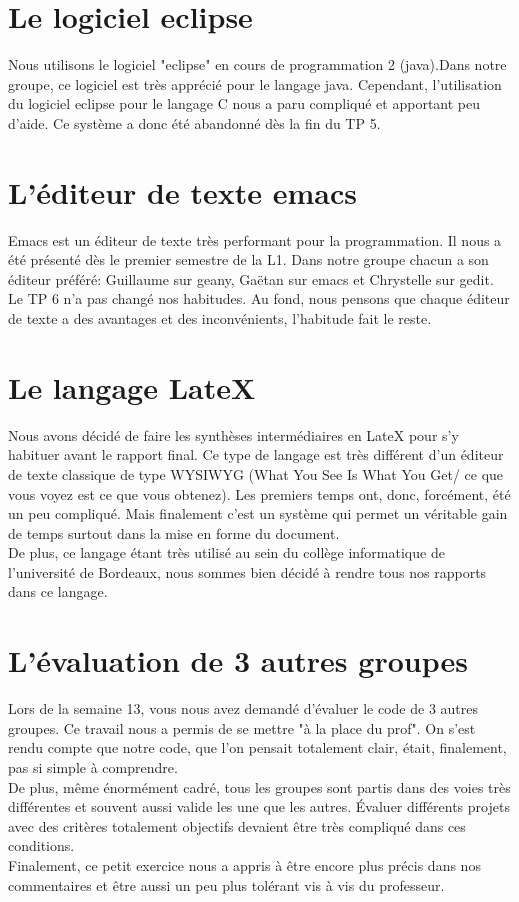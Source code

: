 \documentclass{report}
\begin{document}
\section{Le logiciel eclipse}
Nous utilisons le logiciel "eclipse" en cours de programmation 2 (java).Dans notre groupe, ce logiciel est très apprécié pour le langage java. Cependant, l'utilisation du logiciel eclipse pour le langage C nous a paru compliqué et apportant peu d'aide. Ce système a donc été abandonné dès la fin du TP 5.
\section{L'éditeur de texte emacs}
Emacs est un éditeur de texte très performant pour la programmation. Il nous a été présenté dès le premier semestre de la L1. Dans notre groupe chacun a son éditeur préféré: Guillaume sur geany, Gaëtan sur emacs et Chrystelle sur gedit. Le TP 6 n'a pas changé nos habitudes. Au fond, nous pensons que chaque éditeur de texte a des avantages et des inconvénients, l'habitude fait le reste.
\section{Le langage LateX}
Nous avons décidé de faire les synthèses intermédiaires en LateX pour s'y habituer avant le rapport final. Ce type de langage est très différent d'un éditeur de texte classique de type WYSIWYG (What You See Is What You Get/ ce que vous voyez est ce que vous obtenez). Les premiers temps ont, donc, forcément, été un peu compliqué. Mais finalement c'est un système qui permet un véritable gain de temps surtout dans la mise en forme du document.\\
De plus, ce langage étant très utilisé au sein du collège informatique de l'université de Bordeaux, nous sommes bien décidé à rendre tous nos rapports dans ce langage.
\section{L'évaluation de 3 autres groupes}
Lors de la semaine 13, vous nous avez demandé d'évaluer le code de 3 autres groupes. Ce travail nous a permis de se mettre "à la place du prof". On s'est rendu compte que notre code, que l'on pensait totalement clair, était, finalement, pas si simple à comprendre.\\ De plus, même énormément cadré, tous les groupes sont partis dans des voies très différentes et souvent aussi valide les une que les autres. Évaluer différents projets avec des critères totalement objectifs devaient être très compliqué dans ces conditions.\\ Finalement, ce petit exercice nous a appris à être encore plus précis dans nos commentaires et être aussi un peu plus tolérant vis à vis du professeur.
\end{document}

